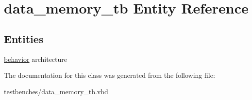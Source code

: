 \hypertarget{classdata__memory__tb}{\section{data\-\_\-memory\-\_\-tb \-Entity \-Reference}
\label{classdata__memory__tb}
}
\subsection*{\-Entities}
\begin{DoxyCompactItemize}
\item 
\hyperlink{classdata__memory__tb_1_1behavior}{behavior} architecture
\end{DoxyCompactItemize}


\-The documentation for this class was generated from the following file\-:\begin{DoxyCompactItemize}
\item 
testbenches/data\-\_\-memory\-\_\-tb.\-vhd\end{DoxyCompactItemize}
